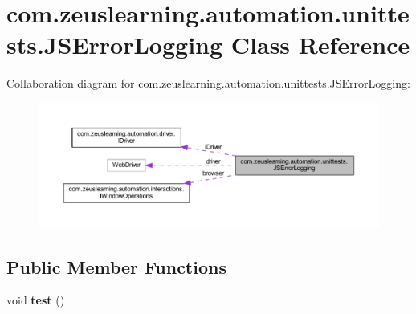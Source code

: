 \hypertarget{classcom_1_1zeuslearning_1_1automation_1_1unittests_1_1JSErrorLogging}{}\section{com.\+zeuslearning.\+automation.\+unittests.\+J\+S\+Error\+Logging Class Reference}
\label{classcom_1_1zeuslearning_1_1automation_1_1unittests_1_1JSErrorLogging}


Collaboration diagram for com.\+zeuslearning.\+automation.\+unittests.\+J\+S\+Error\+Logging\+:\nopagebreak
\begin{figure}[H]
\begin{center}
\leavevmode
\includegraphics[width=350pt]{d1/d36/classcom_1_1zeuslearning_1_1automation_1_1unittests_1_1JSErrorLogging__coll__graph}
\end{center}
\end{figure}
\subsection*{Public Member Functions}
\begin{DoxyCompactItemize}
\item 
\hypertarget{classcom_1_1zeuslearning_1_1automation_1_1unittests_1_1JSErrorLogging_a49d606f7d7bc355878109b8e736788c0}{}\label{classcom_1_1zeuslearning_1_1automation_1_1unittests_1_1JSErrorLogging_a49d606f7d7bc355878109b8e736788c0} 
void {\bfseries test} ()
\end{DoxyCompactItemize}
